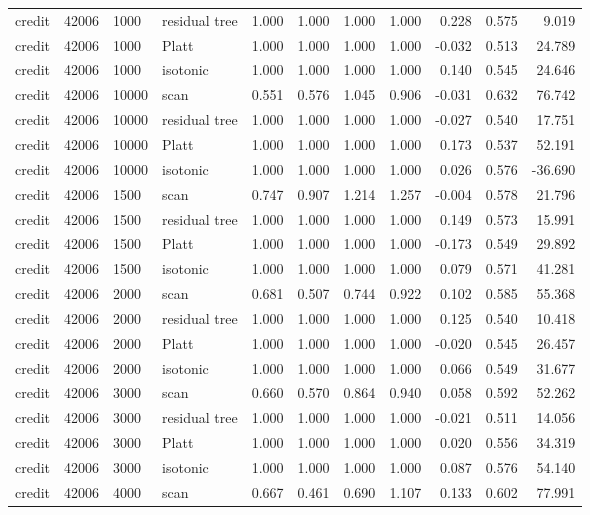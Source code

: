 \begin{tabular}{lrllrrrrrrr}
credit & 42006 & 1000 & residual tree & 1.000 & 1.000 & 1.000 & 1.000 & 0.228 & 0.575 & 9.019 \\
credit & 42006 & 1000 & Platt & 1.000 & 1.000 & 1.000 & 1.000 & -0.032 & 0.513 & 24.789 \\
credit & 42006 & 1000 & isotonic & 1.000 & 1.000 & 1.000 & 1.000 & 0.140 & 0.545 & 24.646 \\
credit & 42006 & 10000 & scan & 0.551 & 0.576 & 1.045 & 0.906 & -0.031 & 0.632 & 76.742 \\
credit & 42006 & 10000 & residual tree & 1.000 & 1.000 & 1.000 & 1.000 & -0.027 & 0.540 & 17.751 \\
credit & 42006 & 10000 & Platt & 1.000 & 1.000 & 1.000 & 1.000 & 0.173 & 0.537 & 52.191 \\
credit & 42006 & 10000 & isotonic & 1.000 & 1.000 & 1.000 & 1.000 & 0.026 & 0.576 & -36.690 \\
credit & 42006 & 1500 & scan & 0.747 & 0.907 & 1.214 & 1.257 & -0.004 & 0.578 & 21.796 \\
credit & 42006 & 1500 & residual tree & 1.000 & 1.000 & 1.000 & 1.000 & 0.149 & 0.573 & 15.991 \\
credit & 42006 & 1500 & Platt & 1.000 & 1.000 & 1.000 & 1.000 & -0.173 & 0.549 & 29.892 \\
credit & 42006 & 1500 & isotonic & 1.000 & 1.000 & 1.000 & 1.000 & 0.079 & 0.571 & 41.281 \\
credit & 42006 & 2000 & scan & 0.681 & 0.507 & 0.744 & 0.922 & 0.102 & 0.585 & 55.368 \\
credit & 42006 & 2000 & residual tree & 1.000 & 1.000 & 1.000 & 1.000 & 0.125 & 0.540 & 10.418 \\
credit & 42006 & 2000 & Platt & 1.000 & 1.000 & 1.000 & 1.000 & -0.020 & 0.545 & 26.457 \\
credit & 42006 & 2000 & isotonic & 1.000 & 1.000 & 1.000 & 1.000 & 0.066 & 0.549 & 31.677 \\
credit & 42006 & 3000 & scan & 0.660 & 0.570 & 0.864 & 0.940 & 0.058 & 0.592 & 52.262 \\
credit & 42006 & 3000 & residual tree & 1.000 & 1.000 & 1.000 & 1.000 & -0.021 & 0.511 & 14.056 \\
credit & 42006 & 3000 & Platt & 1.000 & 1.000 & 1.000 & 1.000 & 0.020 & 0.556 & 34.319 \\
credit & 42006 & 3000 & isotonic & 1.000 & 1.000 & 1.000 & 1.000 & 0.087 & 0.576 & 54.140 \\
credit & 42006 & 4000 & scan & 0.667 & 0.461 & 0.690 & 1.107 & 0.133 & 0.602 & 77.991 \\

\end{tabular}
